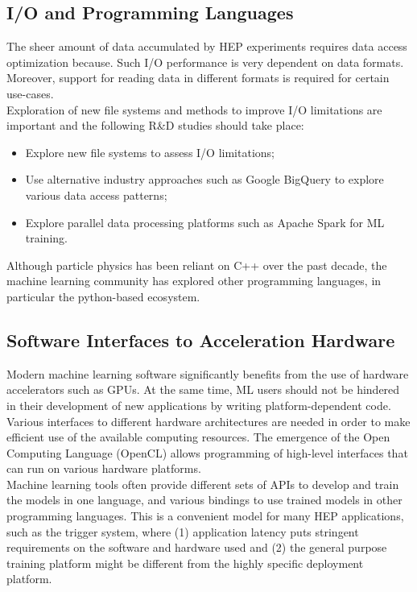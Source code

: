 \subsection{I/O and Programming Languages}\label{sec:software_IO}
The sheer amount of data accumulated by HEP experiments requires data access optimization because. Such I/O performance is very dependent on data formats. Moreover, support for reading data in different formats is required for certain use-cases.\\

Exploration of new file systems and methods to improve I/O limitations are important and the following R\&D studies should take place:
\begin{itemize}
 \item Explore new file systems to assess I/O limitations;
 \item Use alternative industry approaches such as Google BigQuery to explore various data access patterns;
 \item Explore parallel data processing platforms such as Apache Spark for ML training.
\end{itemize}

Although particle physics has been reliant on C++ over the past decade, the machine learning community has explored other programming languages, in particular the python-based ecosystem.

\subsection{Software Interfaces to Acceleration Hardware}\label{sec:software_proglang}
Modern machine learning software significantly benefits from the use of hardware accelerators such as GPUs. At the same time, ML users should not be hindered in their development of new applications by writing platform-dependent code. Various interfaces to different hardware architectures are needed in order to make efficient use of the available computing resources. The emergence of the Open Computing Language (OpenCL) allows programming of high-level interfaces that can run on various hardware platforms.\\

Machine learning tools often provide different sets of APIs to develop and train the models in one language, and various bindings to use trained models in other programming languages. This is a convenient model for many HEP applications, such as the trigger system, where (1) application latency puts stringent requirements on the software and hardware used and (2) the general purpose training platform might be different from the highly specific deployment platform.

